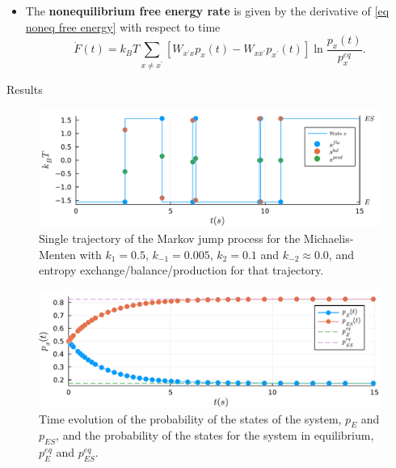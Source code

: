 \documentclass[final]{beamer}
\newlength{\colwidth}
\begin{document}
\begin{frame}[t]
\begin{columns}[t]
\begin{column}{\colwidth}
\begin{itemize}
\item The {\bf nonequilibrium free energy rate} is given by the derivative of \eqref{eq noneq free energy} with respect to time 
\begin{equation*}
\dot{F}(t) = k_B T \sum_{x \neq x^\prime} \left[ W_{x^\prime x} p_x(t) -  W_{x x^\prime}p_{x^\prime}(t) \right] \ln \frac{p_x(t)}{p_x^{eq}}.
\end{equation*}
\end{itemize}
\begin{block}{Results}
\begin{figure}
\begin{center}
%
\includegraphics[scale=1.2]{graphics/f8.pdf}
\end{center}
\caption{\justifying Single trajectory of the Markov jump process for the Michaelis-Menten with $k_{1} = 0.5$, $k_{-1} = 0.005$, $k_{2} = 0.1$ and $k_{-2} \approx 0.0$, and entropy exchange/balance/production for that trajectory.}\label{fig transition}
\end{figure}
\begin{figure}
\begin{center}
%
\includegraphics[scale=1.2]{graphics/f1.pdf}
\end{center}
\label{fig 2-state-system}
\caption{\justifying  Time evolution of the probability of the states of the system, $p_E$ and $p_{ES}$, and the probability of the states for the system in equilibrium, $p_E^{eq}$ and $p_{ES}^{eq}$.}
\end{figure}


\end{block}
\end{column}
\end{columns}
\end{frame}
\end{document}

